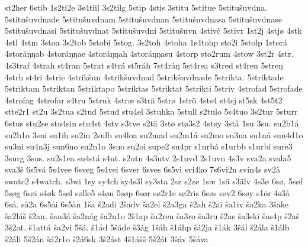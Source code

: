 {    st2her
    6stib
    1s2ti2e
    3s4tiil
    3s2tilg
    5stip
    4stis
    3stitu
    5stitue
    5stitušuvdna.
    5stitušuvdnade
    5stitušuvdnam
    5stitušuvdnan
    5stitušuvdnasa
    5stitušuvdnase
    5stitušuvdnasi
    5stitušuvdnat
    5stitušuvdni
    5stitušuvn
    4stivč
    5stivr
    1st2j
    4stjø
    4stk
    4stl
    4stm
    3stoa
    3s2tob
    5stobi
    5stog.
    3s2toh
    4stoha
    1s4tohp
    sto2i
    5stolp
    1storá
    4storáŋŋab
    4storáŋŋae
    4storáŋŋah
    4storáŋŋasu
    4storp
    sto2rum
    4stow
    3st2r
    4str.
    4s3traf
    4strah
    st4ran
    5strat
    s4trá
    st5ráh
    7st4ráŋ
    5st4rea
    s3tred
    st4ren
    5streŋ
    4strh
    st4ri
    4strie
    4strikšun
    4strikšuvdnad
    5strikšuvdnade
    5strikta.
    5striktade
    5striktam
    5striktan
    5striktapo
    5striktas
    5striktat
    5strikti
    5striv
    4strofad
    5strofade
    4strofag
    4strofar
    s4tru
    5struk
    4stræ
    s3trä
    5strø
    1strö
    4sts4
    st4sj
    st5sk
    4st5t2
    stte2r1
    st2u
    3s2tua
    s2tud
    5stuđ
    stu4el
    3stuhka
    5stull
    s2tulo
    5s4tuo
    3s2tur
    5sturr
    6stus
    stu2se
    stu4sin
    stu4st
    4stv
    s3tve
    s2tä
    3stø
    stø3s2
    4støy
    3stå
    1su
    3su.
    su2b1á
    su2b1o
    3sui
    su1ih
    su2in
    2sulb
    su4loa
    su2mad
    su2m1á
    su2mo
    su3na
    su1ná
    sun4d1o
    su3ni
    su4n3j
    sun6no
    su2n1o
    3suo
    su2oi
    supe2
    su4pr
    s1urbá
    s1urbb
    s1urbi
    sure3
    3surg
    3sus.
    su2s1ea
    su4stá
    s4ut.
    s2utn
    4s3utv
    2s1uvd
    2s1uvn
    4s3v
    sva2a
    svala5
    sva3š
    6s5vá
    5s4vee
    6sveg
    5s4vei
    6sver
    6sves
    6s5vi
    svi4ko
    7s6vi2n
    svin4s
    sv2å
    swatc2
    s4watch.
    s3wi
    1sy
    sy4ch
    sy4s3l
    sy3sta
    2sz
    s2ze
    1sæ
    1sä
    s3älv
    4s3ø
    6sø.
    5søf
    5søg
    6søi
    s4øk
    5søl
    sølle5
    s4øn
    5søp
    6sør
    sø2r1e
    sø2ris
    6søs
    søv2
    6søy
    s1ör
    4s3å
    6så.
    så2a
    6s5åi
    6s5ån
    1ša
    š2adi
    2šadv
    ša2el
    š2a3ga
    š2ah
    š2ai
    ša1iv
    ša2ka
    3šake
    ša2láš
    š2an.
    šan3á
    ša2nág
    ša2n1o
    2š1ap
    ša2ren
    ša3ro
    ša3ru
    š2as
    ša3ski
    šas4p
    š2aš
    3š2at.
    š1attá
    ša2vi
    5šá.
    š1ád
    5šáde
    š3ág
    1šáh
    š1áhp
    šá2ja
    š1ák
    3šál
    š2ála
    š1álb
    š2áli
    5š2án
    šá2r1o
    š2á6sk
    3š2ást
    4š1ášš
    5š2át
    3šáv
    5šáva
}
